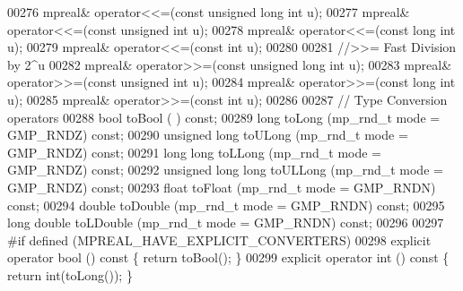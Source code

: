 \begin{DoxyCode}
00276     mpreal& operator<<=(\textcolor{keyword}{const} \textcolor{keywordtype}{unsigned} \textcolor{keywordtype}{long} \textcolor{keywordtype}{int} u);
00277     mpreal& operator<<=(\textcolor{keyword}{const} \textcolor{keywordtype}{unsigned} \textcolor{keywordtype}{int} u);
00278     mpreal& operator<<=(\textcolor{keyword}{const} \textcolor{keywordtype}{long} \textcolor{keywordtype}{int} u);
00279     mpreal& operator<<=(\textcolor{keyword}{const} \textcolor{keywordtype}{int} u);
00280 
00281     \textcolor{comment}{//>>= Fast Division by 2^u}
00282     mpreal& operator>>=(\textcolor{keyword}{const} \textcolor{keywordtype}{unsigned} \textcolor{keywordtype}{long} \textcolor{keywordtype}{int} u);
00283     mpreal& operator>>=(\textcolor{keyword}{const} \textcolor{keywordtype}{unsigned} \textcolor{keywordtype}{int} u);
00284     mpreal& operator>>=(\textcolor{keyword}{const} \textcolor{keywordtype}{long} \textcolor{keywordtype}{int} u);
00285     mpreal& operator>>=(\textcolor{keyword}{const} \textcolor{keywordtype}{int} u);
00286 
00287     \textcolor{comment}{// Type Conversion operators}
00288     \textcolor{keywordtype}{bool}               toBool      (                        )    \textcolor{keyword}{const};
00289     \textcolor{keywordtype}{long}               toLong      (mp\_rnd\_t mode = GMP\_RNDZ)    \textcolor{keyword}{const};
00290     \textcolor{keywordtype}{unsigned} \textcolor{keywordtype}{long}      toULong     (mp\_rnd\_t mode = GMP\_RNDZ)    \textcolor{keyword}{const};
00291     \textcolor{keywordtype}{long} \textcolor{keywordtype}{long}          toLLong     (mp\_rnd\_t mode = GMP\_RNDZ)    \textcolor{keyword}{const};
00292     \textcolor{keywordtype}{unsigned} \textcolor{keywordtype}{long} \textcolor{keywordtype}{long} toULLong    (mp\_rnd\_t mode = GMP\_RNDZ)    \textcolor{keyword}{const};
00293     \textcolor{keywordtype}{float}              toFloat     (mp\_rnd\_t mode = GMP\_RNDN)    \textcolor{keyword}{const};
00294     \textcolor{keywordtype}{double}             toDouble    (mp\_rnd\_t mode = GMP\_RNDN)    \textcolor{keyword}{const};
00295     \textcolor{keywordtype}{long} \textcolor{keywordtype}{double}        toLDouble   (mp\_rnd\_t mode = GMP\_RNDN)    \textcolor{keyword}{const};
00296 
00297 \textcolor{preprocessor}{#if defined (MPREAL\_HAVE\_EXPLICIT\_CONVERTERS)}
00298     \textcolor{keyword}{explicit} \textcolor{keyword}{operator} bool               ()\textcolor{keyword}{ const }\{ \textcolor{keywordflow}{return} toBool();                 \}
00299     \textcolor{keyword}{explicit} \textcolor{keyword}{operator} int                ()\textcolor{keyword}{ const }\{ \textcolor{keywordflow}{return} int(toLong());            \}

\end{DoxyCode}
